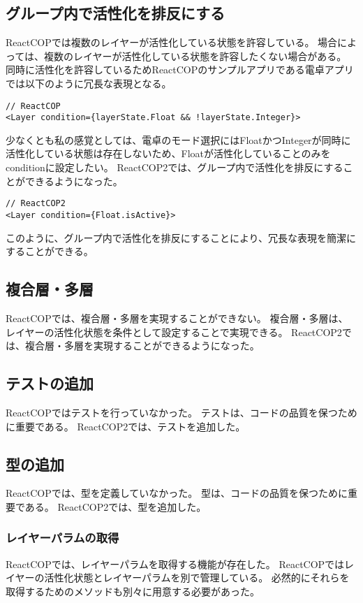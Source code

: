\documentclass{jsarticle}
\begin{document}
\subsection{グループ内で活性化を排反にする}
ReactCOPでは複数のレイヤーが活性化している状態を許容している。
場合によっては、複数のレイヤーが活性化している状態を許容したくない場合がある。
同時に活性化を許容しているためReactCOPのサンプルアプリである電卓アプリでは以下のように冗長な表現となる。
\begin{lstlisting}[]
// ReactCOP
<Layer condition={layerState.Float && !layerState.Integer}>
\end{lstlisting}
少なくとも私の感覚としては、電卓のモード選択にはFloatかつIntegerが同時に活性化している状態は存在しないため、Floatが活性化していることのみをconditionに設定したい。
ReactCOP2では、グループ内で活性化を排反にすることができるようになった。
\begin{lstlisting}[]
// ReactCOP2
<Layer condition={Float.isActive}>
\end{lstlisting}
このように、グループ内で活性化を排反にすることにより、冗長な表現を簡潔にすることができる。

\subsection{複合層・多層}
ReactCOPでは、複合層・多層を実現することができない。
複合層・多層は、レイヤーの活性化状態を条件として設定することで実現できる。
ReactCOP2では、複合層・多層を実現することができるようになった。

\subsection{テストの追加}
ReactCOPではテストを行っていなかった。
テストは、コードの品質を保つために重要である。
ReactCOP2では、テストを追加した。

\subsection{型の追加}
ReactCOPでは、型を定義していなかった。
型は、コードの品質を保つために重要である。
ReactCOP2では、型を追加した。


\subsubsection{レイヤーパラムの取得}
ReactCOPでは、レイヤーパラムを取得する機能が存在した。
ReactCOPではレイヤーの活性化状態とレイヤーパラムを別で管理している。
必然的にそれらを取得するためのメソッドも別々に用意する必要があった。
\end{document}
